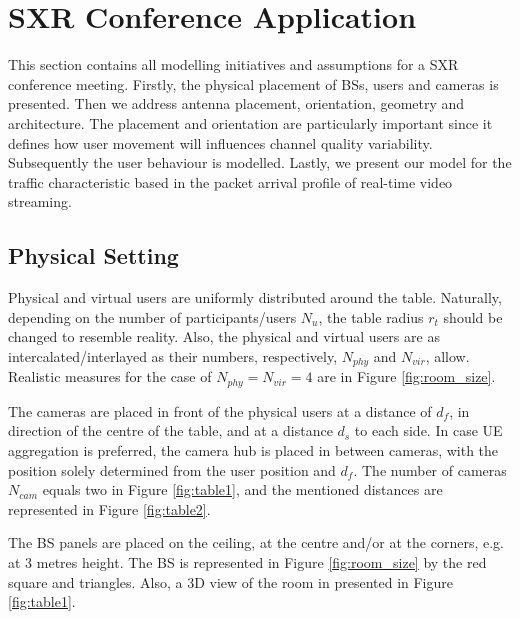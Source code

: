 \section{SXR Conference Application}
\label{sec:sxr_meeting_modelling}

This section contains all modelling initiatives and assumptions for a SXR conference meeting. Firstly, the physical placement of \acp{BS}, users and cameras is presented. Then we address antenna placement, orientation, geometry and architecture. The placement and orientation are particularly important since it defines how user movement will influences channel quality variability. Subsequently the user behaviour is modelled. Lastly, we present our model for the traffic characteristic based in the packet arrival profile of real-time video streaming.

\subsection{Physical Setting}
\label{sec:ue_placement}

Physical and virtual users are uniformly distributed around the table. Naturally, depending on the number of participants/users $N_{u}$, the table radius $r_{t}$ should be changed to resemble reality. Also, the physical and virtual users are as intercalated/interlayed as their numbers, respectively, $N_{phy}$ and $N_{vir}$, allow. Realistic measures for the case of $N_{phy} = N_{vir} = 4$ are in Figure \ref{fig:room_size}.


The cameras are placed in front of the physical users at a distance of $d_f$, in direction of the centre of the table, and at a distance $d_s$ to each side. In case \ac{UE} aggregation is preferred, the camera hub is placed in between cameras, with the position solely determined from the user position and $d_f$. The number of cameras $N_{cam}$ equals two in Figure \ref{fig:table1}, and the mentioned distances are represented in Figure \ref{fig:table2}.

The \ac{BS} panels are placed on the ceiling, at the centre and/or at the corners, e.g. at 3 metres height. The BS is represented in Figure \ref{fig:room_size} by the red square and triangles. Also, a 3D view of the room in presented in Figure \ref{fig:table1}.


